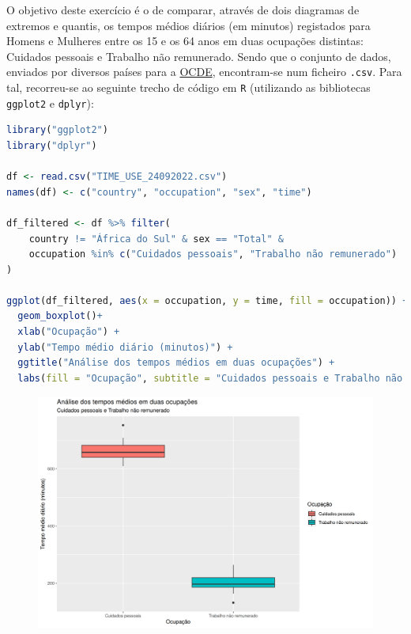 \documentclass[12pt,a4paper]{article}
\begin{document}
O objetivo deste exercício é o de comparar, através de dois diagramas de extremos e quantis, os tempos médios diários (em minutos)
registados para Homens e Mulheres entre os 15 e os 64 anos em duas ocupações distintas: Cuidados pessoais e Trabalho não remunerado.
Sendo que o conjunto de dados, enviados por diversos países para a \href{https://stats.oecd.org/Index.aspx?DataSetCode=TIME_USE}{OCDE}, encontram-se num ficheiro \texttt{.csv}.
Para tal, recorreu-se ao seguinte trecho de código em \texttt{R} (utilizando as bibliotecas \texttt{ggplot2} e \texttt{dplyr}):

\quad

\begin{lstlisting}[language=R]
library("ggplot2")
library("dplyr")

df <- read.csv("TIME_USE_24092022.csv")
names(df) <- c("country", "occupation", "sex", "time")

df_filtered <- df %>% filter(
    country != "África do Sul" & sex == "Total" &
    occupation %in% c("Cuidados pessoais", "Trabalho não remunerado")
)

ggplot(df_filtered, aes(x = occupation, y = time, fill = occupation)) +
  geom_boxplot()+
  xlab("Ocupação") +
  ylab("Tempo médio diário (minutos)") +
  ggtitle("Análise dos tempos médios em duas ocupações") +
  labs(fill = "Ocupação", subtitle = "Cuidados pessoais e Trabalho não remunerado")
\end{lstlisting}

\quad

\begin{figure}[h]
  \centering
  \includegraphics[scale = 0.8]{./ex02.png}
\end{figure}
\end{document}
